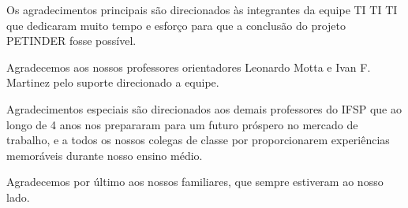 \begin{agradecimentos}

Os agradecimentos principais são direcionados às integrantes da equipe TI TI TI que dedicaram muito tempo e esforço para que a conclusão do projeto PETINDER fosse possível.  

Agradecemos aos nossos professores orientadores Leonardo Motta e Ivan F. Martinez pelo suporte direcionado a equipe.

Agradecimentos especiais são direcionados aos demais professores do \ac{IFSP} que ao longo de 4 anos nos prepararam para um futuro próspero no mercado de trabalho, e a todos os nossos colegas de classe por proporcionarem experiências memoráveis durante nosso ensino médio.

Agradecemos por último aos nossos familiares, que sempre estiveram ao nosso lado.

\end{agradecimentos}
